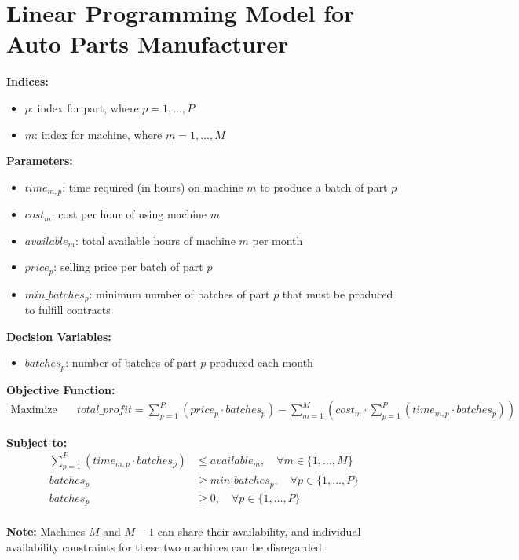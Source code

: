 \documentclass{article}
\begin{document}
\section*{Linear Programming Model for Auto Parts Manufacturer}

\textbf{Indices:}
\begin{itemize}
    \item $p$: index for part, where $p = 1, \ldots, P$
    \item $m$: index for machine, where $m = 1, \ldots, M$
\end{itemize}

\textbf{Parameters:}
\begin{itemize}
    \item $time_{m,p}$: time required (in hours) on machine $m$ to produce a batch of part $p$
    \item $cost_{m}$: cost per hour of using machine $m$
    \item $available_{m}$: total available hours of machine $m$ per month
    \item $price_{p}$: selling price per batch of part $p$
    \item $min\_batches_{p}$: minimum number of batches of part $p$ that must be produced to fulfill contracts
\end{itemize}

\textbf{Decision Variables:}
\begin{itemize}
    \item $batches_{p}$: number of batches of part $p$ produced each month
\end{itemize}

\textbf{Objective Function:}
\begin{align*}
\text{Maximize} \quad & total\_profit = \sum_{p=1}^{P} (price_{p} \cdot batches_{p}) - \sum_{m=1}^{M} (cost_{m} \cdot \sum_{p=1}^{P} (time_{m,p} \cdot batches_{p}))
\end{align*}

\textbf{Subject to:}
\begin{align*}
\sum_{p=1}^{P} (time_{m,p} \cdot batches_{p}) & \leq available_{m}, \quad \forall m \in \{1, \ldots, M\} \\
batches_{p} & \geq min\_batches_{p}, \quad \forall p \in \{1, \ldots, P\} \\
batches_{p} & \geq 0, \quad \forall p \in \{1, \ldots, P\} \\
\end{align*}

\textbf{Note:} 
Machines $M$ and $M-1$ can share their availability, and individual availability constraints for these two machines can be disregarded.
\end{document}
